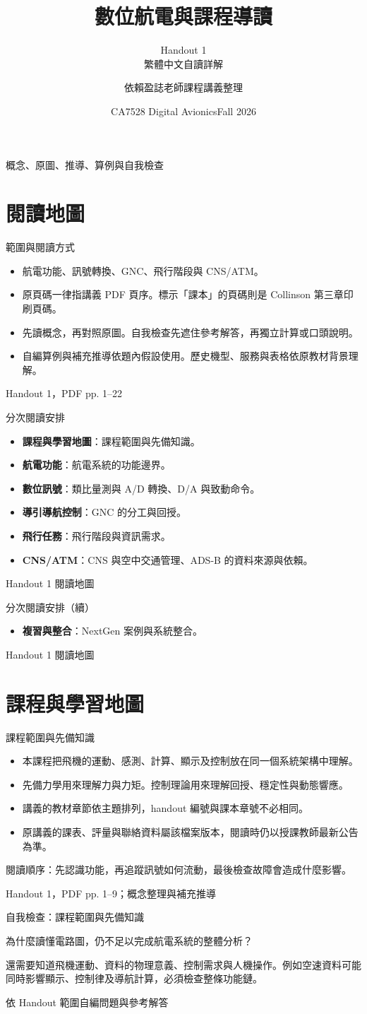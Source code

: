 \documentclass[aspectratio=169,11pt]{beamer}
\title{數位航電與課程導讀}
\subtitle{Handout 1\\繁體中文自讀詳解}
\author{依賴盈誌老師課程講義整理}
\date{CA7528 Digital Avionics\quad Fall 2026}
\newcommand{\src}[1]{\par\vfill{\scriptsize\color{teal}#1}}
\newcommand{\slide}[3]{\begin{frame}[t]{#1}#3\src{#2}\end{frame}}
\newcommand{\bi}{\begin{itemize}\setlength{\itemsep}{5pt}}
\newcommand{\ei}{\end{itemize}}
\newcommand{\key}[1]{\par\medskip{\color{teal}\bfseries #1}\par\smallskip}
\begin{document}
\begin{frame}\titlepage\centering\small 概念、原圖、推導、算例與自我檢查\end{frame}
\section{閱讀地圖}
\slide{範圍與閱讀方式}{Handout 1，PDF pp. 1--22}{
\bi
\item 航電功能、訊號轉換、GNC、飛行階段與 CNS/ATM。
\item 原頁碼一律指講義 PDF 頁序。標示「課本」的頁碼則是 Collinson 第三章印刷頁碼。
\item 先讀概念，再對照原圖。自我檢查先遮住參考解答，再獨立計算或口頭說明。
\item 自編算例與補充推導依題內假設使用。歷史機型、服務與表格依原教材背景理解。
\ei
}
\slide{分次閱讀安排}{Handout 1 閱讀地圖}{
\small
\bi
\item \textbf{課程與學習地圖}：課程範圍與先備知識。
\item \textbf{航電功能}：航電系統的功能邊界。
\item \textbf{數位訊號}：類比量測與 A/D 轉換、D/A 與致動命令。
\item \textbf{導引導航控制}：GNC 的分工與回授。
\item \textbf{飛行任務}：飛行階段與資訊需求。
\item \textbf{CNS/ATM}：CNS 與空中交通管理、ADS-B 的資料來源與依賴。
\ei
}
\slide{分次閱讀安排（續）}{Handout 1 閱讀地圖}{
\small
\bi
\item \textbf{複習與整合}：NextGen 案例與系統整合。
\ei
}
\section{課程與學習地圖}
\slide{課程範圍與先備知識}{Handout 1，PDF pp. 1--9；概念整理與補充推導}{
\small
\bi
\item 本課程把飛機的運動、感測、計算、顯示及控制放在同一個系統架構中理解。
\item 先備力學用來理解力與力矩。控制理論用來理解回授、穩定性與動態響應。
\item 講義的教材章節依主題排列，handout 編號與課本章號不必相同。
\item 原講義的課表、評量與聯絡資料屬該檔案版本，閱讀時仍以授課教師最新公告為準。
\ei
\key{閱讀重點}閱讀順序：先認識功能，再追蹤訊號如何流動，最後檢查故障會造成什麼影響。
}
\slide{自我檢查：課程範圍與先備知識}{依 Handout 範圍自編問題與參考解答}{
\small
\key{先自行作答}
為什麼讀懂電路圖，仍不足以完成航電系統的整體分析？
\key{參考解答}
還需要知道飛機運動、資料的物理意義、控制需求與人機操作。例如空速資料可能同時影響顯示、控制律及導航計算，必須檢查整條功能鏈。
}
\end{document}
